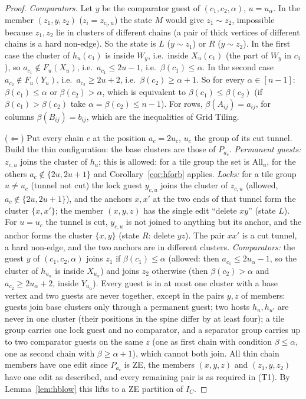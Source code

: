 \begin{proof}
\emph{Comparators.} Let $y$ be the comparator guest of $(c_1,c_2,\alpha)$, $u=u_\alpha$. In the member $(z_1,y,z_2)$ ($z_i=z_{c_i,u}$) the state $M$ would give $z_1\sim z_2$, impossible because $z_1,z_2$ lie in clusters of different chains (a pair of thick vertices of different chains is a hard non-edge). So the state is $L$ ($y\sim z_1$) or $R$ ($y\sim z_2$). In the first case the cluster of $h_u(c_1)$ is inside $W_y$, i.e.\ inside $X_u(c_1)$ (the part of $W_y$ in $c_1$), so $a_{c_1}\notin F_u(X_u)$, i.e.\ $a_{c_1}\le2u-1$, i.e.\ $\beta(c_1)\le\alpha$. In the second case $a_{c_2}\notin F_u(Y_u)$, i.e.\ $a_{c_2}\ge2u+2$, i.e.\ $\beta(c_2)\ge\alpha+1$. So for every $\alpha\in[n-1]$: $\beta(c_1)\le\alpha$ or $\beta(c_2)>\alpha$, which is equivalent to $\beta(c_1)\le\beta(c_2)$ (if $\beta(c_1)>\beta(c_2)$ take $\alpha=\beta(c_2)\le n-1$). For rows, $\beta(A_{ij})=a_{ij}$, for columns $\beta(B_{ij})=b_{ij}$, which are the inequalities of Grid Tiling.

($\Leftarrow$) Put every chain $c$ at the position $a_c=2u_c$, $u_c$ the group of its cut tunnel. Build the thin configuration: the base clusters are those of $P_{a_c}$. \emph{Permanent guests:} $z_{c,u}$ joins the cluster of $h_u$; this is allowed: for a tile group the set is $\mathrm{All}_u$, for the others $a_c\notin\{2u,2u+1\}$ and Corollary~\ref{cor:hforb} applies. \emph{Locks:} for a tile group $u\ne u_c$ (tunnel not cut) the lock guest $y_{c,u}$ joins the cluster of $z_{c,u}$ (allowed, $a_c\notin\{2u,2u+1\}$), and the anchors $x,x'$ at the two ends of that tunnel form the cluster $\{x,x'\}$; the member $(x,y,z)$ has the single edit ``delete $xy$'' (state $L$). For $u=u_c$ the tunnel is cut, $y_{c,u}$ is not joined to anything but its anchor, and the anchor forms the cluster $\{x,y\}$ (state $R$: delete $yz$). The pair $xx'$ is a cut tunnel, a hard non-edge, and the two anchors are in different clusters. \emph{Comparators:} the guest $y$ of $(c_1,c_2,\alpha)$ joins $z_1$ if $\beta(c_1)\le\alpha$ (allowed: then $a_{c_1}\le2u_\alpha-1$, so the cluster of $h_{u_\alpha}$ is inside $X_{u_\alpha}$) and joins $z_2$ otherwise (then $\beta(c_2)>\alpha$ and $a_{c_2}\ge2u_\alpha+2$, inside $Y_{u_\alpha}$). Every guest is in at most one cluster with a base vertex and two guests are never together, except in the pairs $y,z$ of members: guests join base clusters only through a permanent guest; two hosts $h_u,h_{u'}$ are never in one cluster (their positions in the spine differ by at least four); a tile group carries one lock guest and no comparator, and a separator group carries up to two comparator guests on the same $z$ (one as first chain with condition $\beta\le\alpha$, one as second chain with $\beta\ge\alpha+1$), which cannot both join. All thin chain members have one edit since $P_{a_c}$ is ZE, the members $(x,y,z)$ and $(z_1,y,z_2)$ have one edit as described, and every remaining pair is as required in (T1). By Lemma~\ref{lem:hblow} this lifts to a ZE partition of $I_C$.
\end{proof}

